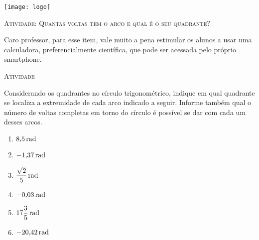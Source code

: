 \documentclass[10 pt,usenames,dvipsnames, oneside]{article}
\begin{document}
\begin{center}
  \begin{minipage}[l]{3cm}
\texttt{[image: logo]}    
\end{minipage}\hfill
\begin{minipage}[r]{.8\textwidth}
 {\Large \scshape Atividade: Quantas voltas tem o arco e qual é o seu quadrante?}  
\end{minipage}
\end{center}
\vspace{.2cm}

\ifdefined\prof

\begin{sugestions}
\vspace{1em}
Caro professor, para esse item, vale muito a pena estimular os alunos a usar uma calculadora, preferencialmente científica, que pode ser acessada pelo próprio smartphone.

\end{sugestions}

\bigskip
\begin{center}
{\large \scshape Atividade}
\end{center}
\fi

Considerando os quadrantes no círculo trigonométrico, indique em qual quadrante se localiza a extremidade de cada arco indicado a seguir. Informe também qual o número de voltas completas em torno do círculo é possível se dar com cada um desses arcos.

\begin{enumerate}
\item $8{,}5\operatorname{rad}$
\item $-1{,}37\operatorname{rad}$
\item $\dfrac{\sqrt{2}}{5}\operatorname{rad}$
\item $-0{,}03\operatorname{rad}$
\item $17\dfrac{3}{5}\operatorname{rad}$
\item $-20{,}42\operatorname{rad}$
\end{enumerate}
\end{document}
